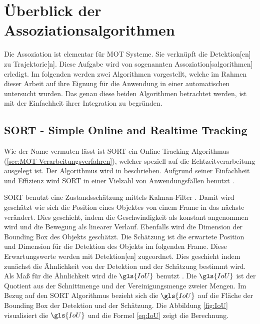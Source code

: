 \section{Überblick der Assoziationsalgorithmen}

Die \gls{Assoziation} ist elementar für \gls{MOT} Systeme. Sie verknüpft die \gls{Detektion}[en] zu \gls{Trajektorie}[n]. Diese Aufgabe wird von sogenannten \gls{Assoziation}[salgorithmen] erledigt. Im folgenden werden zwei Algorithmen vorgestellt, welche im Rahmen dieser Arbeit auf ihre Eignung für die Anwendung in einer automatischen  untersucht wurden. Das genau diese beiden Algorithmen betrachtet werden, ist mit der Einfachheit ihrer Integration zu begründen. 


\subsection{SORT - Simple Online and Realtime Tracking} \label{sec:MOT SORT}
Wie der Name vermuten lässt ist \acrshort{SORT} ein \gls{Online Tracking} Algorithmus (\ref{sec:MOT Verarbeitungsverfahren}), welcher speziell auf die Echtzeitverarbeitung ausgelegt ist. Der Algorithmus wird in \cite{Bewley.2016} beschrieben. Aufgrund seiner Einfachheit und Effizienz wird \acrshort{SORT} in einer Vielzahl von Anwendungsfällen benutzt \cite{Chen.2023}. \par
{}

\acrshort{SORT} benutzt eine Zustandsschätzung mittels Kalman-Filter \cite{Kalman.1960}. Damit wird geschätzt wie sich die Position eines Objektes von einem \gls{Frame} in das nächste verändert. Dies geschieht, indem die Geschwindigkeit als konstant angenommen wird und die Bewegung als linearer Verlauf. Ebenfalls wird die Dimension der \gls{Bounding Box} des Objekts geschätzt. Die Schätzung ist die erwartete Position und Dimension für die \gls{Detektion} des Objekts im folgenden \gls{Frame}. Diese Erwartungswerte werden mit \gls{Detektion}[en] zugeordnet. Dies geschieht indem zunächst die Ähnlichkeit von der \gls{Detektion} und der Schätzung bestimmt wird. Als Maß für die Ähnlichkeit wird die \(\gls{IoU}\) benutzt  \cite{Bewley.2016}. Die \(\gls{IoU}\) ist der Quotient aus der Schnittmenge und der Vereinigungsmenge zweier Mengen. Im Bezug auf den \acrshort{SORT} Algorithmus bezieht sich die \(\gls{IoU}\) auf die Fläche der \gls{Bounding Box} der \gls{Detektion} und der Schätzung. Die Abbildung \ref{fig:IoU} visualisiert die \(\gls{IoU}\) und die Formel \ref{eq:IoU} zeigt die Berechnung. 

